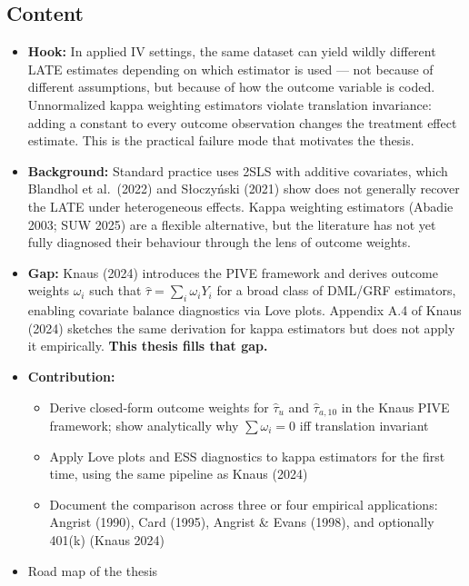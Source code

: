 \documentclass[12pt, a4paper]{article}
\begin{document}
\subsection*{Content}
\begin{itemize}
  \item \textbf{Hook:} In applied IV settings, the same dataset can yield wildly different LATE estimates depending on which estimator is used --- not because of different assumptions, but because of how the outcome variable is coded. Unnormalized kappa weighting estimators violate translation invariance: adding a constant to every outcome observation changes the treatment effect estimate. This is the practical failure mode that motivates the thesis.
  \item \textbf{Background:} Standard practice uses 2SLS with additive covariates, which Blandhol et al.\ (2022) and Słoczyński (2021) show does not generally recover the LATE under heterogeneous effects. Kappa weighting estimators (Abadie 2003; SUW 2025) are a flexible alternative, but the literature has not yet fully diagnosed their behaviour through the lens of outcome weights.
  \item \textbf{Gap:} Knaus (2024) introduces the PIVE framework and derives outcome weights $\omega_i$ such that $\hat\tau = \sum_i \omega_i Y_i$ for a broad class of DML/GRF estimators, enabling covariate balance diagnostics via Love plots. Appendix A.4 of Knaus (2024) sketches the same derivation for kappa estimators but does not apply it empirically. \textbf{This thesis fills that gap.}
  \item \textbf{Contribution:}
    \begin{itemize}
      \item Derive closed-form outcome weights for $\hat\tau_u$ and $\hat\tau_{a,10}$ in the Knaus PIVE framework; show analytically why $\sum \omega_i = 0$ iff translation invariant
      \item Apply Love plots and ESS diagnostics to kappa estimators for the first time, using the same pipeline as Knaus (2024)
      \item Document the comparison across three or four empirical applications: Angrist (1990), Card (1995), Angrist \& Evans (1998), and optionally 401(k) (Knaus 2024)
    \end{itemize}
  \item Road map of the thesis
\end{itemize}

\end{document}

